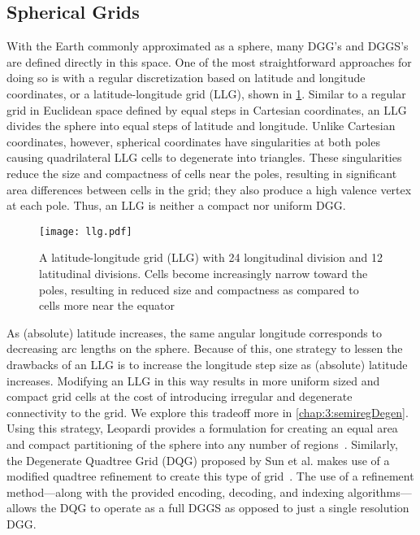 \subsection{Spherical Grids} \label{chap:2:spherical}
With the Earth commonly approximated as a sphere, many DGG's and DGGS's are defined directly in this space.
One of the most straightforward approaches for doing so is with a regular discretization based on latitude and longitude coordinates, or a latitude-longitude grid (LLG), shown in \cref{fig:llg}.
Similar to a regular grid in Euclidean space defined by equal steps in Cartesian coordinates, an LLG divides the sphere into equal steps of latitude and longitude.
Unlike Cartesian coordinates, however, spherical coordinates have singularities at both poles causing quadrilateral LLG cells to degenerate into triangles.
These singularities reduce the size and compactness of cells near the poles, resulting in significant area differences between cells in the grid; they also produce a high valence vertex at each pole.
Thus, an LLG is neither a compact nor uniform DGG.


\begin{figure}[ht!]
	\centering
	\texttt{[image: llg.pdf]}
	\caption[A latitude-longitude grid]{
		A latitude-longitude grid (LLG) with 24 longitudinal division and 12 latitudinal divisions.
		Cells become increasingly narrow toward the poles, resulting in reduced size and compactness as compared to cells more near the equator
	}
	\label{fig:llg}
\end{figure}


As (absolute) latitude increases, the same angular longitude corresponds to decreasing arc lengths on the sphere.
Because of this, one strategy to lessen the drawbacks of an LLG is to increase the longitude step size as (absolute) latitude increases.
Modifying an LLG in this way results in more uniform sized and compact grid cells at the cost of introducing irregular and degenerate connectivity to the grid.
We explore this tradeoff more in \cref{chap:3:semiregDegen}.
Using this strategy, Leopardi provides a formulation for creating an equal area and compact partitioning of the sphere into any number of regions~\cite{leopardi2006partition}.
Similarly, the Degenerate Quadtree Grid (DQG) proposed by Sun et al. makes use of a modified quadtree refinement to create this type of grid~\cite{sun2008global}.
The use of a refinement method---along with the provided encoding, decoding, and indexing algorithms---allows the DQG to operate as a full DGGS as opposed to just a single resolution DGG.


